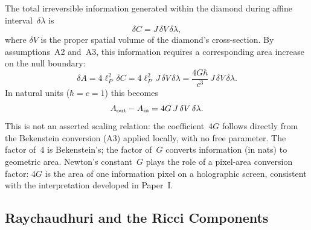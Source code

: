 \documentclass[12pt]{article}
\begin{document}
The total irreversible information generated within the diamond
during affine interval~$\delta\lambda$ is
\begin{equation}
  \delta C = J\,\delta V\,\delta\lambda,
  \label{eq:deltaC}
\end{equation}
where $\delta V$ is the proper spatial volume of the diamond's
cross-section.
By assumptions~A2 and~A3, this information requires a
corresponding area increase on the null boundary:
\begin{equation}
  \delta A = 4\ell_P^2\,\delta C
           = 4\ell_P^2\,J\,\delta V\,\delta\lambda
           = \frac{4G\hbar}{c^3}\,J\,\delta V\,\delta\lambda.
  \label{eq:deltaA-full}
\end{equation}
In natural units ($\hbar=c=1$) this becomes
\begin{equation}
  A_{\rm out} - A_{\rm in}
  = 4G\,J\,\delta V\,\delta\lambda.
  \label{eq:area-growth}
\end{equation}
This is not an asserted scaling relation: the coefficient~$4G$
follows directly from the Bekenstein conversion (A3) applied
locally, with no free parameter.
The factor of~$4$ is Bekenstein's; the factor of~$G$ converts
information (in nats) to geometric area.
Newton's constant~$G$ plays the role of a pixel-area
conversion factor: $4G$ is the area of one information pixel
on a holographic screen, consistent with the interpretation
developed in Paper~I.

\subsection{Raychaudhuri and the Ricci Components}
\end{document}

